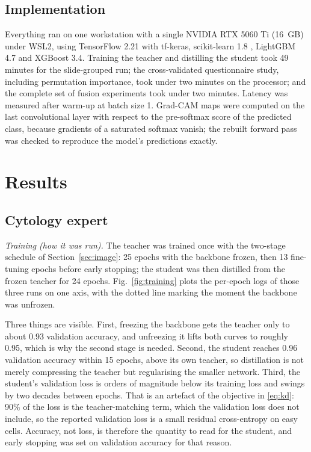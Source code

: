 \documentclass[lettersize,journal]{IEEEtran}
\begin{document}
\subsection{Implementation}
Everything ran on one workstation with a single NVIDIA RTX 5060 Ti (16~GB) under WSL2, using TensorFlow 2.21 with tf-keras, scikit-learn 1.8 \cite{pedregosa2011scikit}, LightGBM 4.7 and XGBoost 3.4. Training the teacher and distilling the student took 49 minutes for the slide-grouped run; the cross-validated questionnaire study, including permutation importance, took under two minutes on the processor; and the complete set of fusion experiments took under two minutes. Latency was measured after warm-up at batch size 1. Grad-CAM \cite{selvaraju2017gradcam} maps were computed on the last convolutional layer with respect to the pre-softmax score of the predicted class, because gradients of a saturated softmax vanish; the rebuilt forward pass was checked to reproduce the model's predictions exactly.

\section{Results}

\subsection{Cytology expert}
\emph{Training (how it was run).} The teacher was trained once with the two-stage schedule of Section~\ref{sec:image}: 25 epochs with the backbone frozen, then 13 fine-tuning epochs before early stopping; the student was then distilled from the frozen teacher for 24 epochs. Fig.~\ref{fig:training} plots the per-epoch logs of those three runs on one axis, with the dotted line marking the moment the backbone was unfrozen.

Three things are visible. First, freezing the backbone gets the teacher only to about 0.93 validation accuracy, and unfreezing it lifts both curves to roughly 0.95, which is why the second stage is needed. Second, the student reaches 0.96 validation accuracy within 15 epochs, above its own teacher, so distillation is not merely compressing the teacher but regularising the smaller network. Third, the student's validation loss is orders of magnitude below its training loss and swings by two decades between epochs. That is an artefact of the objective in \eqref{eq:kd}: 90\% of the loss is the teacher-matching term, which the validation loss does not include, so the reported validation loss is a small residual cross-entropy on easy cells. Accuracy, not loss, is therefore the quantity to read for the student, and early stopping was set on validation accuracy for that reason.
\end{document}
